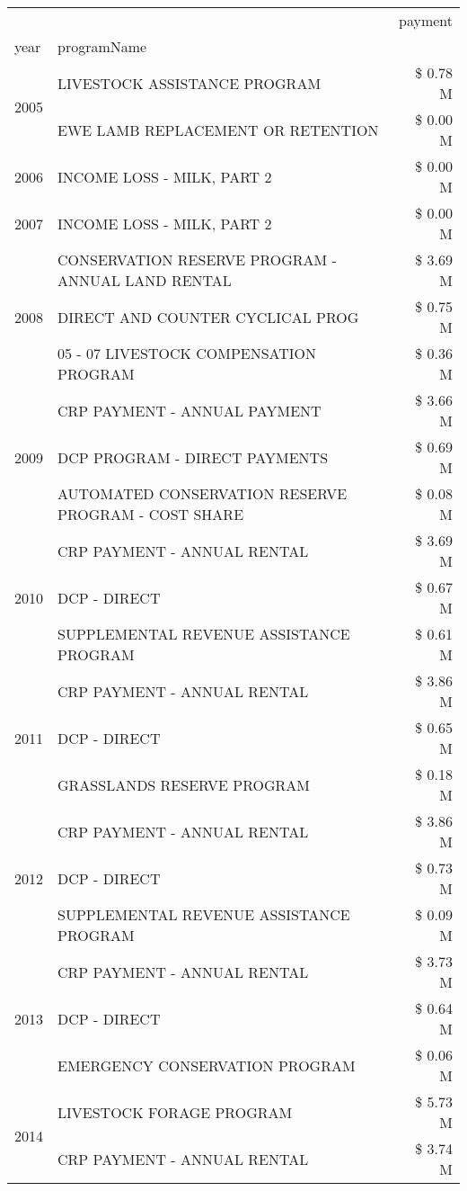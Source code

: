 \begin{tabular}{llr}
\toprule
 &  & payment \\
year & programName &  \\
\midrule
\multirow[t]{2}{*}{2005} & LIVESTOCK ASSISTANCE PROGRAM & \$ 0.78 M \\
 & EWE LAMB REPLACEMENT OR RETENTION & \$ 0.00 M \\
\cline{1-3}
2006 & INCOME LOSS - MILK, PART 2 & \$ 0.00 M \\
\cline{1-3}
2007 & INCOME LOSS - MILK, PART 2 & \$ 0.00 M \\
\cline{1-3}
\multirow[t]{3}{*}{2008} & CONSERVATION RESERVE PROGRAM - ANNUAL LAND RENTAL & \$ 3.69 M \\
 & DIRECT AND COUNTER CYCLICAL PROG & \$ 0.75 M \\
 & 05 - 07 LIVESTOCK COMPENSATION PROGRAM & \$ 0.36 M \\
\cline{1-3}
\multirow[t]{3}{*}{2009} & CRP PAYMENT - ANNUAL PAYMENT & \$ 3.66 M \\
 & DCP PROGRAM - DIRECT PAYMENTS & \$ 0.69 M \\
 & AUTOMATED CONSERVATION RESERVE PROGRAM - COST SHARE & \$ 0.08 M \\
\cline{1-3}
\multirow[t]{3}{*}{2010} & CRP PAYMENT - ANNUAL RENTAL & \$ 3.69 M \\
 & DCP - DIRECT & \$ 0.67 M \\
 & SUPPLEMENTAL REVENUE ASSISTANCE PROGRAM & \$ 0.61 M \\
\cline{1-3}
\multirow[t]{3}{*}{2011} & CRP PAYMENT - ANNUAL RENTAL & \$ 3.86 M \\
 & DCP - DIRECT & \$ 0.65 M \\
 & GRASSLANDS RESERVE PROGRAM & \$ 0.18 M \\
\cline{1-3}
\multirow[t]{3}{*}{2012} & CRP PAYMENT - ANNUAL RENTAL & \$ 3.86 M \\
 & DCP - DIRECT & \$ 0.73 M \\
 & SUPPLEMENTAL REVENUE ASSISTANCE PROGRAM & \$ 0.09 M \\
\cline{1-3}
\multirow[t]{3}{*}{2013} & CRP PAYMENT - ANNUAL RENTAL & \$ 3.73 M \\
 & DCP - DIRECT & \$ 0.64 M \\
 & EMERGENCY CONSERVATION PROGRAM & \$ 0.06 M \\
\cline{1-3}
\multirow[t]{3}{*}{2014} & LIVESTOCK FORAGE PROGRAM & \$ 5.73 M \\
 & CRP PAYMENT - ANNUAL RENTAL & \$ 3.74 M \\

\end{tabular}
